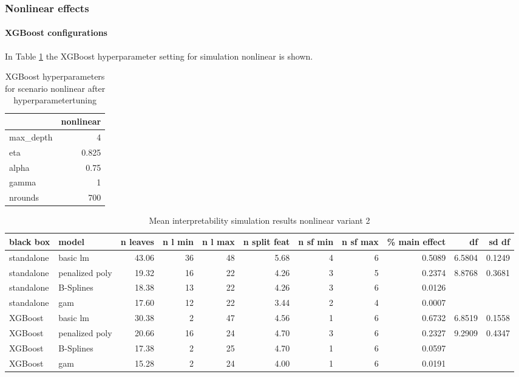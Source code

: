 \subsubsection{Nonlinear effects}

\paragraph{XGBoost configurations}
In Table \ref{tab:app_xgboost_config_nonlinear} the XGBoost hyperparameter setting for simulation nonlinear is shown.
\begin{table}[!htb]
    \centering
    \begin{tabular}{l|r}
    \hline
    & nonlinear  \\
    \hline
    max\_depth & 4 \\
    eta & 0.825 \\
    alpha & 0.75 \\
    gamma & 1 \\
    nrounds & 700 \\
    \hline
    \end{tabular}
    \caption{XGBoost hyperparameters for scenario nonlinear after hyperparametertuning}
    \label{tab:app_xgboost_config_nonlinear}
\end{table}


\begin{table}[!htb]

\centering \tiny
\begin{tabular}[t]{l|l|r|r|r|r|r|r|r|r|r}
\hline
black box & model & n leaves & n l min & n l max & n split feat & n sf min & n sf max & \% main effect & df & sd df\\
\hline
standalone & basic lm & 43.06 & 36 & 48 & 5.68 & 4 & 6 & 0.5089 & 6.5804 & 0.1249\\
standalone & penalized poly & 19.32 & 16 & 22 & 4.26 & 3 & 5 & 0.2374 & 8.8768 & 0.3681\\
standalone & B-Splines & 18.38 & 13 & 22 & 4.26 & 3 & 6 & 0.0126 & & \\
standalone & gam & 17.60 & 12 & 22 & 3.44 & 2 & 4 & 0.0007 & & \\
\hline
XGBoost & basic lm & 30.38 & 2 & 47 & 4.56 & 1 & 6 & 0.6732 & 6.8519 & 0.1558\\
XGBoost & penalized poly & 20.66 & 16 & 24 & 4.70 & 3 & 6 & 0.2327 & 9.2909 & 0.4347\\
XGBoost & B-Splines & 17.38 & 2 & 25 & 4.70 & 1 & 6 & 0.0597 & &\\
XGBoost & gam & 15.28 & 2 & 24 & 4.00 & 1 & 6 & 0.0191 & &\\
\hline
\end{tabular}
\caption{Mean interpretability simulation results nonlinear variant 2}
\label{tab:app_nonlinear_interpretability}

\end{table}


